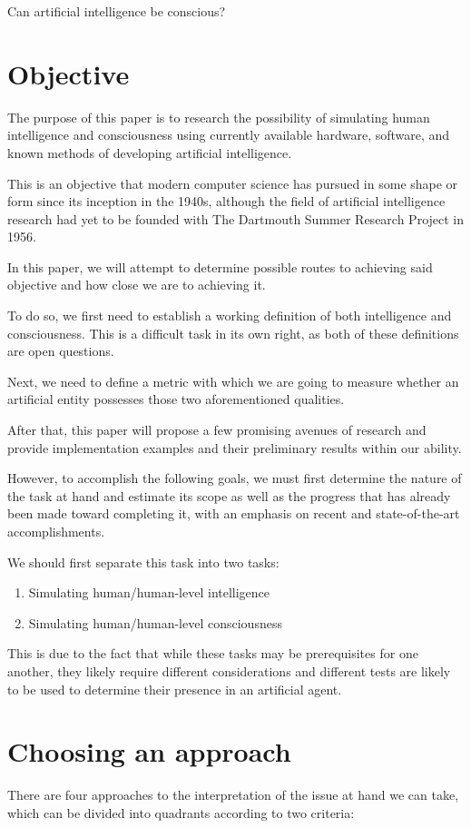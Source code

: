 \documentclass[masterthesis]{fer}
\begin{document}
Can artificial intelligence be conscious?
\section{Objective}
The purpose of this paper is to research the possibility of simulating human intelligence and consciousness using currently available hardware, software, and known methods of developing artificial intelligence.

This is an objective that modern computer science has pursued in some shape or form since its inception in the 1940s, although the field of artificial intelligence research had yet to be founded with The Dartmouth Summer Research Project in 1956.

In this paper, we will attempt to determine possible routes to achieving said objective and how close we are to achieving it.

To do so, we first need to establish a working definition of both intelligence and consciousness. This is a difficult task in its own right, as both of these definitions are open questions.

Next, we need to define a metric with which we are going to measure whether an artificial entity possesses those two aforementioned qualities.

After that, this paper will propose a few promising avenues of research and provide implementation examples and their preliminary results within our ability.

However, to accomplish the following goals, we must first determine the nature of the task at hand and estimate its scope as well as the progress that has already been made toward completing it, with an emphasis on recent and state-of-the-art accomplishments.

We should first separate this task into two tasks:

\begin{enumerate}
\item Simulating human/human-level intelligence
\item Simulating human/human-level consciousness
\end{enumerate}

This is due to the fact that while these tasks may be prerequisites for one another, they likely require different considerations and different tests are likely to be used to determine their presence in an artificial agent.
\section{Choosing an approach}
There are four approaches to the interpretation of the issue at hand we can take, which can be divided into quadrants according to two criteria:
\end{document}
